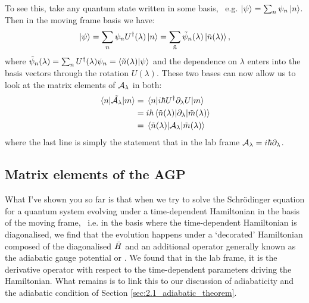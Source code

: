     To see this, take any quantum state written in some basis, \@~e.g. $\ket{\psi} = \sum_n \psi_n \ket{n}$. Then in the moving frame basis we have:
    \begin{equation}\label{eq:AGP_basis_change}
            \ket{\psi} = \sum_n \psi_n U^{\dagger}(\lambda) \ket{n} = \sum_{\Tilde{n}} \Tilde{\psi}_n (\lambda) \ket*{\Tilde{n}(\lambda)},
    \end{equation}
    where $\Tilde{\psi}_n (\lambda) = \sum_n U^{\dagger}(\lambda) \psi_n = \braket{\Tilde{n}(\lambda)}{\psi}$ and the dependence on $\lambda$ enters into the basis vectors through the rotation $U(\lambda)$. These two bases can now allow us to look at the matrix elements of $\mathcal{A}_{\lambda}$ in both:
    \begin{equation}\label{eq:AGP_as_derivative}
        \begin{aligned}
            \mel{n}{\Tilde{\mathcal{A}_{\lambda}}}{m} &= \mel{n}{i\hbar U^{\dagger}\partial_{\lambda}U}{m} \\
            &= i\hbar \mel{\Tilde{n}(\lambda)}{\partial_{\lambda}}{\Tilde{m}(\lambda)} \\
            &= \mel{\Tilde{n}(\lambda)}{\mathcal{A}_{\lambda}}{\Tilde{m}(\lambda)}
        \end{aligned}
    \end{equation}
    where the last line is simply the statement that in the lab frame $\mathcal{A}_{\lambda} = i\hbar \partial_{\lambda}$.

    \subsection{Matrix elements of the AGP}

    What I've shown you so far is that when we try to solve the Schr\"{o}dinger equation for a quantum system evolving under a time-dependent Hamiltonian in the basis of the moving frame, \@~i.e. in the basis where the time-dependent Hamiltonian is diagonalised, we find that the evolution happens under a `decorated' Hamiltonian composed of the diagonalised $\Tilde{H}$ and an additional operator generally known as the adiabatic gauge potential or . We found that in the lab frame, it is the derivative operator with respect to the time-dependent parameters driving the Hamiltonian. What remains is to link this to our discussion of adiabaticity and the adiabatic condition of Section \ref{sec:2.1_adiabatic_theorem}.

